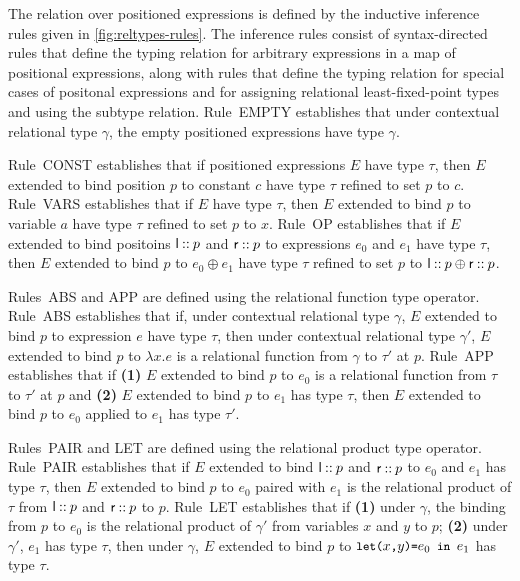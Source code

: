 
The relation over positioned expressions is defined by the inductive
inference rules given in \autoref{fig:reltypes-rules}.
%
The inference rules consist of syntax-directed rules that define the
typing relation for arbitrary expressions in a map of positional
expressions, along with rules that define the typing relation for
special cases of positonal expressions and for assigning relational
least-fixed-point types and using the subtype relation.
Rule~EMPTY establishes that under contextual relational type $\gamma$,
the empty positioned expressions have type $\gamma$.

Rule~CONST establishes that if positioned expressions $E$ have type
$\tau$, then $E$ extended to bind position $p$ to constant $c$ have
type $\tau$ refined to set $p$ to $c$.
Rule~VARS establishes that if $E$ have type $\tau$, then $E$ extended
to bind $p$ to variable $a$ have type $\tau$ refined to set $p$ to
$x$.
Rule~OP establishes that if $E$ extended to bind positoins
$\mathsf{l} \mathbin{::} p$ and $\mathsf{r} \mathbin{::} p$ to expressions
$e_0$ and $e_1$ have type $\tau$, then $E$ extended to bind $p$ to
$e_0 \oplus e_1$ have type $\tau$ refined to set $p$ to
$\mathsf{l} \mathbin{::} p \oplus \mathsf{r} \mathbin{::} p$.

Rules~ABS and APP are defined using the relational function type
operator.
%
Rule~ABS establishes that if, under contextual relational type
$\gamma$, $E$ extended to bind $p$ to expression $e$ have type $\tau$,
then under contextual relational type $\gamma'$, $E$ extended to bind
$p$ to $\lambda x. e$ is a relational function from $\gamma$ to
$\tau'$ at $p$.
Rule~APP establishes that if %
\textbf{(1)} $E$ extended to bind $p$ to $e_0$ is a relational
function from $\tau$ to $\tau'$ at $p$ and %
\textbf{(2)} $E$ extended to bind $p$ to $e_1$ has type $\tau$, then
$E$ extended to bind $p$ to $e_0$ applied to $e_1$ has type $\tau'$.

Rules~PAIR and LET are defined using the relational product type
operator.
Rule~PAIR establishes that if $E$ extended to bind
$\mathsf{l} \mathbin{::} p$ and $\mathsf{r} \mathbin{::} p$ to $e_0$ and $e_1$ has
type $\tau$, then $E$ extended to bind $p$ to $e_0$ paired with $e_1$
is the relational product of $\tau$ from $\mathsf{l} \mathbin{::} p$ and
$\mathsf{r} \mathbin{::} p$ to $p$.
Rule~LET establishes that if %
\textbf{(1)} under $\gamma$, the binding from $p$ to $e_0$ is the
relational product of $\gamma'$ from variables $x$ and $y$ to $p$;
%
\textbf{(2)} under $\gamma'$, $e_1$ has type $\tau$, then under
$\gamma$, $E$ extended to bind $p$ to $\letexp{x}{y}{e_0}{e_1}$ has
type $\tau$.

